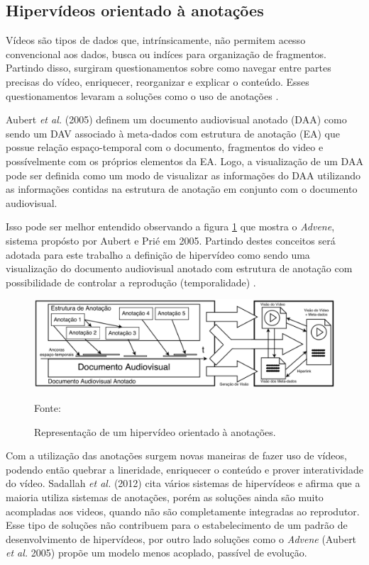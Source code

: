 \subsection{Hipervídeos orientado à anotações}

Vídeos são tipos de dados que, intrínsicamente, não permitem acesso convencional aos dados, busca ou indíces para organização de fragmentos. Partindo disso, surgiram questionamentos sobre como navegar entre partes precisas do vídeo, enriquecer, reorganizar e explicar o conteúdo. Esses questionamentos levaram a soluções como o uso de anotações \cite{sadallah2012}.

Aubert \textit{et al.} (2005) definem um documento audiovisual anotado (DAA) como sendo um DAV associado à meta-dados com estrutura de anotação (EA) que possue relação espaço-temporal com o documento, fragmentos do video e possívelmente com os próprios elementos da EA. Logo, a visualização de um DAA pode ser definida como um modo de visualizar as informações do DAA utilizando as informações contidas na estrutura de anotação em conjunto com o documento audiovisual.

Isso pode ser melhor entendido observando a figura \ref{fig:diagram_DAVOA} que mostra o \textit{Advene}, sistema propósto por Aubert e Prié em 2005. Partindo destes conceitos será adotada para este trabalho a definição de hipervídeo como sendo uma visualização do documento audiovisual anotado com estrutura de anotação com possibilidade de controlar a reprodução (temporalidade) \cite{aubert2005}.

\begin{figure}[h!]
	\centering
  	\includegraphics[width=.9\linewidth]{figuras/diagram_DAVOA.eps}
  	\caption{Representação de um hipervídeo orientado à anotações.}
  	\small{Fonte: \cite{sadallah2012}}
  	\label{fig:diagram_DAVOA}
\end{figure}

Com a utilização das anotações surgem novas maneiras de fazer uso de vídeos, podendo então quebrar a lineridade, enriquecer o conteúdo e prover interatividade do vídeo. Sadallah \textit{et al.} (2012) cita vários sistemas de hipervídeos e afirma que a maioria utiliza sistemas de anotações, porém as soluções ainda são muito acompladas aos videos, quando não são completamente integradas ao reprodutor. Esse tipo de soluções não contribuem para o estabelecimento de um padrão de desenvolvimento de hipervídeos, por outro lado soluções como o \textit{Advene} (Aubert \textit{et al.} 2005) propõe um modelo menos acoplado, passível de evolução.


